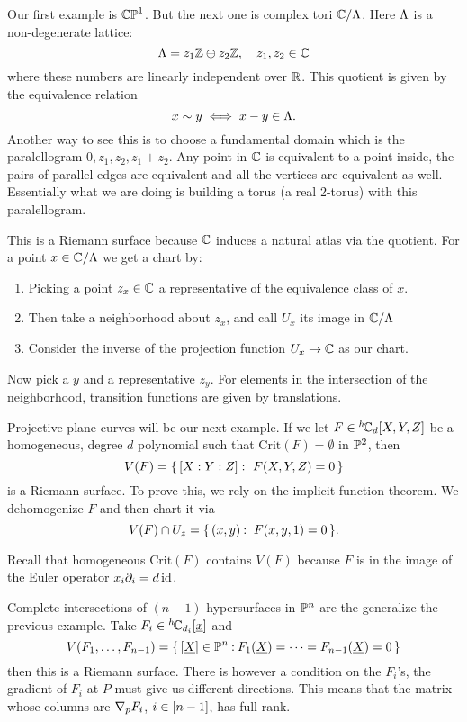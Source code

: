 \documentclass[12pt]{memoir}
\begin{document}
Our first example is $\mathbb{CP}^1$. But the next one is complex tori $\mathbb{C}/\Lambda$. Here $\Lambda$ is a non-degenerate lattice:
$$\Lambda= z_1\mathbb{Z}\oplus z_2\mathbb{Z},\quad z_1,z_2\in\mathbb{C}$$
where these numbers are linearly independent over $\mathbb{R}$. This quotient is given by the equivalence relation 
$$x\sim y\iff x-y\in\Lambda.$$
Another way to see this is to choose a fundamental domain which is the paralellogram $0,z_1,z_2,z_1+z_2$. Any point in $\mathbb{C}$ is equivalent to a point inside, the pairs of parallel edges are equivalent and all the vertices are equivalent as well. Essentially what we are doing is building a torus (a real 2-torus) with this paralellogram.\par
This is a Riemann surface because $\mathbb{C}$ induces a natural atlas via the quotient. For a point $x\in\mathbb{C}/\Lambda$ we get a chart by:
\begin{enumerate}
    \item Picking a point $z_x\in\mathbb{C}$ a representative of the equivalence class of $x$.
    \item Then take a neighborhood about $z_x$, and call $U_x$ its image in $\mathbb{C}/\Lambda$
    \item Consider the inverse of the projection function $U_x\to\mathbb{C}$ as our chart.
\end{enumerate}
Now pick a $y$ and a representative $z_y$. For elements in the intersection of the neighborhood, transition functions are given by translations.

\begin{Ex}
    Projective plane curves will be our next example. If we let $F\in{}^{h\!}\mathbb{C}_d[X,Y,Z]$ be a homogeneous, degree $d$ polynomial such that $\text{Crit}(F)=\emptyset$ in $\mathbb{P}^2$, then 
    $$V(F)=\{\,[X:Y:Z]:\ F(X,Y,Z)=0\,\}$$
    is a Riemann surface. To prove this, we rely on the implicit function theorem. We dehomogenize $F$ and then chart it via 
    $$V(F)\cap U_z=\{\,(x,y)\mathbin{:}\ F(x,y,1)=0\,\}.$$
\end{Ex}

\begin{Rmk}
Recall that homogeneous $\text{Crit}(F)$ contains $V(F)$ because $F$ is in the image of the Euler operator $x_i\partial_i=d\operatorname{id}$. 
\end{Rmk}

\begin{Ex}
    Complete intersections of $(n-1)$ hypersurfaces in $\mathbb{P}^n$ are the generalize the previous example. Take $F_i\in{}^{h\!}\mathbb{C}_{d_i}[\underline x]$ and 
    $$V(F_1,\dots,F_{n-1})=\{\,[\underline{X}]\in\mathbb{P}^n\mathbin{:} F_1(\underline X)=\dots=F_{n-1}(\underline X)=0\,\}$$
    then this is a Riemann surface. There is however a condition on the $F_i$'s, the gradient of $F_i$ at $P$ must give us different directions. This means that the matrix whose columns are $\nabla_p F_i$, $i\in\left\lbrack n-1\right\rbrack$, has full rank. 
\end{Ex}
\end{document}
